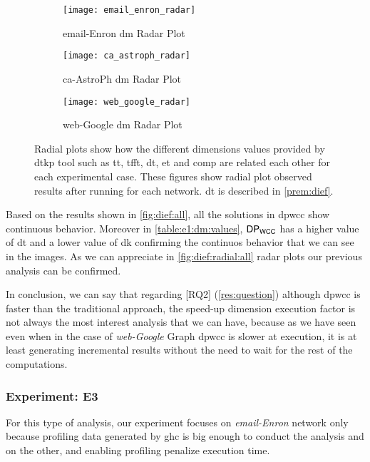  \begin{figure}[!htp]
  \centering
  \begin{subfigure}[t]{0.3\textwidth}
   \texttt{[image: email\_enron\_radar]}
   \caption{email-Enron \acrlong{dm} Radar Plot}
    \label{fig:dief:4}
  \end{subfigure}\hfill
  \begin{subfigure}[t]{0.3\textwidth}
   \texttt{[image: ca\_astroph\_radar]}
   \caption{ca-AstroPh \acrlong{dm} Radar Plot}
    \label{fig:dief:5}
  \end{subfigure}\hfill
  \begin{subfigure}[t]{0.3\textwidth}
   \texttt{[image: web\_google\_radar]}
   \caption{web-Google \acrlong{dm} Radar Plot}
    \label{fig:dief:6}
  \end{subfigure}\hfill
   \caption{Radial plots show how the different dimensions values provided by \acrshort{dtkp} tool such as \acrshort{tt}, \acrshort{tfft}, \acrshort{dt}, \acrshort{et} and \acrshort{comp} are related each other for each experimental case. These figures show radial plot observed results after running for each network. \acrshort{dt} is described in \autoref{prem:dief}.}
   \label{fig:dief:radial:all}
 \end{figure}

Based on the results shown in \autoref{fig:dief:all}, all the solutions in \acrshort{dpwcc} show continuous behavior.
Moreover in \autoref{table:e1:dm:values}, $\mathsf{DP_{WCC}}$ has a higher value of \acrshort{dt} and a lower value of \acrshort{dk} confirming the continuos behavior that we can see in the images.
As we can appreciate in \autoref{fig:dief:radial:all} radar plots our previous analysis can be confirmed.

In conclusion, we can say that regarding [RQ2] (\autoref{res:question}) although \acrshort{dpwcc} is faster than the traditional approach, the speed-up dimension execution factor is not always the most interest analysis that we can have, because as we have seen even when in the case of \emph{web-Google} Graph \acrshort{dpwcc} is slower at execution, it is at least generating incremental results without the need to wait for the rest of the computations.

\iffalse
\subsubsection{Experiment: E3}
For this type of analysis, our experiment focuses on \emph{email-Enron} network \cite{netenron} only because profiling data generated by \acrshort{ghc} is big enough to conduct the analysis and on the other, and enabling profiling penalize execution time.

